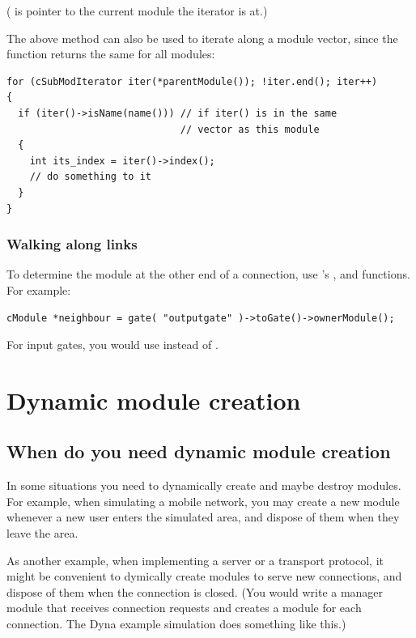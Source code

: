 ( is pointer to the current module the iterator is at.)


The above method can also be used to iterate along a module
vector, since the 
function returns the same for all modules:

\begin{verbatim}
for (cSubModIterator iter(*parentModule()); !iter.end(); iter++)
{
  if (iter()->isName(name())) // if iter() is in the same
                              // vector as this module
  {
    int its_index = iter()->index();
    // do something to it
  }
}
\end{verbatim}


\subsubsection{Walking along links}


To determine the module at the other end of a connection, use
's ,  and
 functions. For example:

\begin{verbatim}
cModule *neighbour = gate( "outputgate" )->toGate()->ownerModule();
\end{verbatim}


For input gates, you would use  instead of .





\section{Dynamic module creation}
\label{ch:simple-modules:dynamic-module-creation}

\subsection{When do you need dynamic module creation}

In some situations you need to dynamically create and maybe destroy
modules. For example, when simulating a mobile network,
you may create a new module whenever a new user enters
the simulated area, and dispose of them when they leave the area.

As another example, when implementing a server or a transport
protocol, it might be convenient to dymically create modules
to serve new connections, and dispose of them when the connection
is closed. (You would write a manager module that receives connection
requests and creates a module for each connection.
The Dyna example simulation does something like this.)

